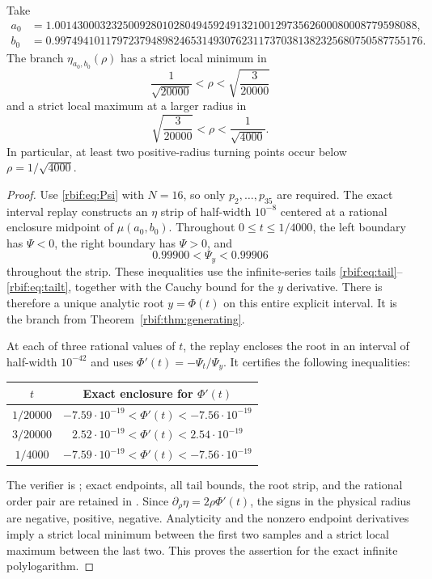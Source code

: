 \begin{theorem}
\label{rbif:thm:witness}
Take
\begin{align*}
 a_0&=1.0014300032325009280102804945924913210012973562600080008779598088,\\
 b_0&=0.99749410117972379489824653149307623117370381382325680750587755176.
\end{align*}
The branch $\eta_{a_0,b_0}(\rho)$ has a strict local minimum in
\[
 \frac1{\sqrt{20000}}<\rho<\sqrt{\frac3{20000}}
\]
and a strict local maximum at a larger radius in
\[
 \sqrt{\frac3{20000}}<\rho<\frac1{\sqrt{4000}}.
\]
In particular, at least two positive-radius turning points occur below
$\rho=1/\sqrt{4000}$.
\end{theorem}
\begin{proof}
Use \eqref{rbif:eq:Psi} with $N=16$, so only
$p_2,\ldots,p_{35}$ are required. The exact interval replay constructs
an $\eta$ strip of half-width $10^{-8}$ centered at a rational enclosure
midpoint of $\mu(a_0,b_0)$. Throughout
$0\le t\le1/4000$, the left boundary has $\Psi<0$, the right boundary
has $\Psi>0$, and
\begin{equation}
 0.99900<\Psi_y<0.99906
 \label{rbif:eq:witnessstrip}
\end{equation}
throughout the strip. These inequalities use the infinite-series tails
\eqref{rbif:eq:tail}--\eqref{rbif:eq:tailt}, together with the Cauchy
bound for the $y$ derivative. There is therefore a unique analytic root
$y=\Phi(t)$ on this entire explicit interval. It is the branch from
Theorem~\ref{rbif:thm:generating}.

At each of three rational values of $t$, the replay encloses the root in
an interval of half-width $10^{-42}$ and uses
$\Phi'(t)=-\Psi_t/\Psi_y$. It certifies the following inequalities:
\begin{center}
\begin{tabular}{@{}cc@{}}
\toprule
$t$ & Exact enclosure for $\Phi'(t)$\\
\midrule
$1/20000$ & $-7.59\cdot10^{-19}<\Phi'(t)<-7.56\cdot10^{-19}$\\[1mm]
$3/20000$ & $ 2.52\cdot10^{-19}<\Phi'(t)< 2.54\cdot10^{-19}$\\[1mm]
$1/4000$ & $-7.59\cdot10^{-19}<\Phi'(t)<-7.56\cdot10^{-19}$\\
\bottomrule
\end{tabular}
\end{center}
The verifier is ; exact endpoints, all tail
bounds, the root strip, and the rational order pair are retained in
. Since $\partial_\rho\eta=2\rho\Phi'(t)$,
the signs in the physical radius are negative, positive, negative.
Analyticity and the nonzero endpoint derivatives imply a strict local
minimum between the first two samples and a strict local maximum between
the last two. This proves the assertion for the exact infinite
polylogarithm.
\end{proof}

